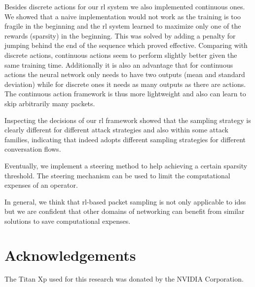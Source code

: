 \documentclass[conference]{IEEEtran}
\begin{document}
Besides discrete actions for our \gls{rl} system we also implemented continuous ones. We showed that a naive implementation would not work as the training is too fragile in the beginning and the \gls{rl} system learned to maximize only one of the rewards (sparsity) in the beginning. This was solved by adding a penalty for jumping behind the end of the sequence which proved effective. Comparing with discrete actions, continuous actions seem to perform slightly better given the same training time. Additionally it is also an advantage that for continuous actions the neural network only needs to have two outputs (mean and standard deviation) while for discrete ones it needs as many outputs as there are actions. The continuous action framework is thus more lightweight and also can learn to skip arbitrarily many packets.

Inspecting the decisions of our \gls{rl} framework showed that the sampling strategy is clearly different for different attack strategies and also within some attack families, indicating that \ours{} indeed adopts different sampling strategies for different conversation flows.

Eventually, we implement a steering method to help achieving a certain sparsity threshold. The steering mechanism can be used to limit the computational expenses of an operator.

In general, we think that \gls{rl}-based packet sampling is not only applicable to \glspl{ids} but we are confident that other domains of networking can benefit from similar solutions to save computational expenses.

\section*{Acknowledgements}
The Titan Xp used for this research was donated by the NVIDIA Corporation.

\renewcommand*{\bibfont}{\small}


\end{document}
